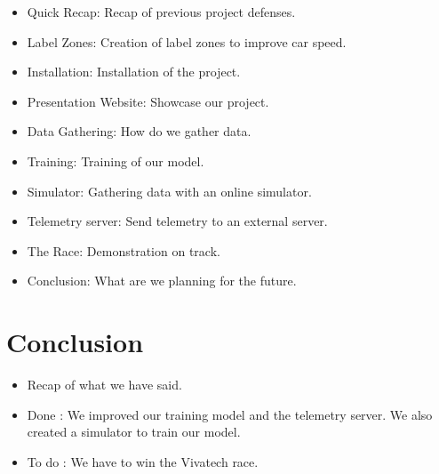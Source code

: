 \documentclass[11pt]{article}
\begin{document}
\begin{itemize}
 
\item Quick Recap: Recap of previous project defenses. 
\item Label Zones: Creation of label zones to improve car speed. 
\item Installation: Installation of the project.
\item Presentation Website: Showcase our project.
\item Data Gathering: How do we gather data. 
\item Training: Training of our model.
\item Simulator: Gathering data with an online simulator.
\item Telemetry server: Send telemetry to an external server.
\item The Race: Demonstration on track.
\item Conclusion: What are we planning for the future.

\end{itemize}

\section {Conclusion}

\begin{itemize}
\item Recap of what we have said.
\item Done : We improved our training model and the telemetry server. We also created a simulator to train our model. 

\item To do : We have to win the Vivatech race.

\end{itemize}
\end{document}
